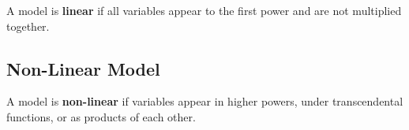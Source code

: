 \begin{definition}
A model is \textbf{linear} if all variables appear to the first power and are not multiplied together.
\end{definition}

\subsection{Non-Linear Model}

\begin{definition}
A model is \textbf{non-linear} if variables appear in higher powers, under transcendental functions, or as products of each other.
\end{definition}
